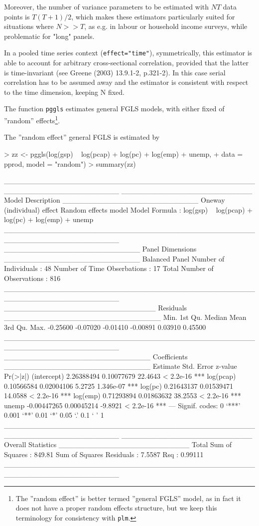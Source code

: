 \documentclass{article}
\begin{document}
Moreover, the number of variance parameters to be estimated with $NT$ data points is $T(T+1)/2$, which makes these estimators particularly suited for situations where $N>>T$, as e.g. in labour or household income surveys, while problematic for "long" panels. 

In a pooled time series context (\texttt{effect="time"}), symmetrically, this estimator is able to account for arbitrary cross-sectional correlation, provided that the latter is time-invariant (see Greene (2003) 13.9.1-2, p.321-2). In this case serial correlation has to be assumed away and the estimator is consistent with respect to the time dimension, keeping N fixed.

The function \texttt{pggls} estimates general FGLS models, with either fixed of ''random'' effects\footnote{The ''random effect'' is better termed ''general FGLS'' model, as in fact it does not have a proper random effects structure, but we keep this terminology for consistency with \texttt{plm}.}. 

The ''random effect'' general FGLS is estimated by
 
\begin{Schunk}
\begin{Sinput}
> zz <- pggls(log(gsp) ~ log(pcap) + log(pc) + log(emp) + unemp, 
+     data = pprod, model = "random")
> summary(zz)
\end{Sinput}
\begin{Soutput}
______________________________________________________________________ 
_________________________ Model Description __________________________
Oneway (individual) effect
Random effects model
Model Formula             : log(gsp) ~ log(pcap) + log(pc) + 
                                log(emp) + unemp
______________________________________________________________________ 
__________________________ Panel Dimensions __________________________
Balanced Panel
Number of Individuals        :  48
Number of Time Obserbations  :  17
Total Number of Observations :  816
______________________________________________________________________ 
_____________________________ Residuals ______________________________
    Min.  1st Qu.   Median     Mean  3rd Qu.     Max. 
-0.25600 -0.07020 -0.01410 -0.00891  0.03910  0.45500 
______________________________________________________________________ 
____________________________ Coefficients ____________________________
               Estimate  Std. Error z-value  Pr(>|z|)    
(intercept)  2.26388494  0.10077679 22.4643 < 2.2e-16 ***
log(pcap)    0.10566584  0.02004106  5.2725 1.346e-07 ***
log(pc)      0.21643137  0.01539471 14.0588 < 2.2e-16 ***
log(emp)     0.71293894  0.01863632 38.2553 < 2.2e-16 ***
unemp       -0.00447265  0.00045214 -9.8921 < 2.2e-16 ***
---
Signif. codes:  0 ‘***’ 0.001 ‘**’ 0.01 ‘*’ 0.05 ‘.’ 0.1 ‘ ’ 1 
______________________________________________________________________ 
_________________________ Overall Statistics _________________________
Total Sum of Squares       : 849.81
Sum of Squares Residuals   : 7.5587
Rsq                        : 0.99111
______________________________________________________________________ 
\end{Soutput}
\end{Schunk}
\end{document}
